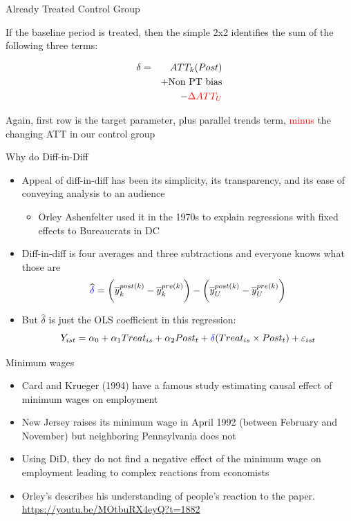 \documentclass{beamer}
\begin{document}
\begin{frame}{Already Treated Control Group}

If the baseline period is treated, then the simple 2x2 identifies the sum of the following three terms:

\begin{eqnarray*}
\delta &=& ATT_k(Post) \\&&+ \text{Non PT bias} \\&&- \textcolor{red}{\Delta ATT_U}
\end{eqnarray*}

Again, first row is the target parameter, plus parallel trends term, \textcolor{red}{minus} the changing ATT in our control group

\end{frame}






\begin{frame}{Why do Diff-in-Diff}

\begin{itemize}
\item Appeal of diff-in-diff has been its simplicity, its transparency, and its ease of conveying analysis to an audience 
	\begin{itemize}
	\item Orley Ashenfelter used it in the 1970s to explain regressions with fixed effects to Bureaucrats in DC 
	\end{itemize}
\item Diff-in-diff is four averages and three subtractions and everyone knows what those are
$$\widehat{\textcolor{blue}{\delta}} = \bigg ( \overline{y}_k^{post(k)} - \overline{y}_k^{pre(k)} \bigg ) - \bigg ( \overline{y}_U^{post(k)} - \overline{y}_U^{pre(k)} \bigg ) $$
\item But $\widehat{\delta}$ is just the OLS coefficient in this regression:
$$Y_{ist} = \alpha_0 + \alpha_1 Treat_{is} + \alpha_2 Post_{t} + \textcolor{blue}{\delta} (Treat_{is} \times Post_t) + \varepsilon_{ist} $$
\end{itemize}

\end{frame}

\begin{frame}{Minimum wages}

\begin{itemize}
\item Card and Krueger (1994) have a famous study estimating causal effect of minimum wages on employment
\item  New Jersey raises its minimum wage in April 1992 (between February and November) but neighboring Pennsylvania does not
\item Using DiD, they do not find a negative effect of the minimum wage on employment leading to complex reactions from economists
\item Orley's describes his understanding of people's reaction to the paper.  \\ \url{https://youtu.be/MOtbuRX4eyQ?t=1882}
\end{itemize}

\end{frame}
\end{document}
